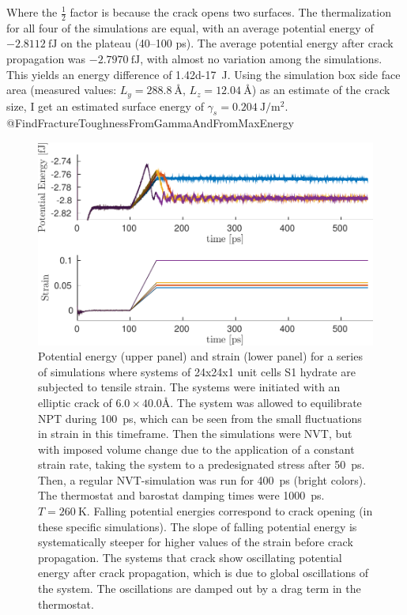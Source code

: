 Where the $\frac{1}{2}$ factor is because the crack opens two surfaces. The thermalization for all four of the simulations are equal, with an average potential energy of $\SI{-2.8112}{\femto\joule}$ on the plateau (40--100 \si{\pico\second}). The average potential energy after crack propagation was $\SI{-2.7970}{\femto\joule}$, with almost no variation among the simulations. This yields an energy difference of \SI{1.42d-17}{\joule}. Using the simulation box side face area (measured values: $L_y = \SI{288.8}{\angstrom}$, $L_z = \SI{12.04}{\angstrom}$) as an estimate of the crack size, I get an estimated surface energy of $\gamma_s = \SI{0.204}{\joule\per\meter\squared}.$
@FindFractureToughnessFromGammaAndFromMaxEnergy

\begin{figure}
\includegraphics[width=\textwidth]{../figures/thesis/proof_of_concept_poteng_strain.pdf}
\caption{Potential energy (upper panel) and strain (lower panel) for a series of simulations where systems of 24x24x1 unit cells S1 hydrate are subjected to tensile strain. The systems were initiated with an elliptic crack of $6.0 \times 40.0 \si{\angstrom}$. The system was allowed to equilibrate NPT during \SI{100}{\pico\second}, which can be seen from the small fluctuations in strain in this timeframe. Then the simulations were NVT, but with imposed volume change due to the application of a constant strain rate, taking the system to a predesignated stress after \SI{50}{\pico\second}. Then, a regular NVT-simulation was run for \SI{400}{\pico\second} (bright colors). The thermostat and barostat damping times were \SI{1000}{\pico\second}. $T=\SI{260}{\kelvin}$. Falling potential energies correspond to crack opening (in these specific simulations). The slope of falling potential energy is systematically steeper for higher values of the strain before crack propagation. The systems that crack show oscillating potential energy after crack propagation, which is due to global oscillations of the system. The oscillations are damped out by a drag term in the thermostat. }
\label{fig:proof_of_concept_crack}
\end{figure}


